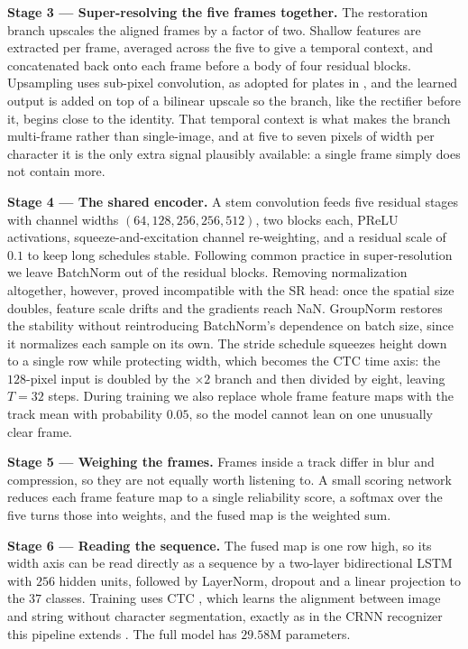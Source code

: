 \documentclass[runningheads]{llncs}
\begin{document}
\textbf{Stage 3 --- Super-resolving the five frames together.} The restoration branch upscales the aligned frames by a factor of two. Shallow features are extracted per frame, averaged across the five to give a temporal context, and concatenated back onto each frame before a body of four residual blocks. Upsampling uses sub-pixel convolution, as adopted for plates in \cite{nascimento2023attention}, and the learned output is added on top of a bilinear upscale so the branch, like the rectifier before it, begins close to the identity. That temporal context is what makes the branch multi-frame rather than single-image, and at five to seven pixels of width per character it is the only extra signal plausibly available: a single frame simply does not contain more.

\textbf{Stage 4 --- The shared encoder.} A stem convolution feeds five residual stages with channel widths $(64, 128, 256, 256, 512)$, two blocks each, PReLU activations, squeeze-and-excitation channel re-weighting, and a residual scale of $0.1$ to keep long schedules stable. Following common practice in super-resolution we leave BatchNorm out of the residual blocks. Removing normalization altogether, however, proved incompatible with the SR head: once the spatial size doubles, feature scale drifts and the gradients reach NaN. GroupNorm \cite{wu2018groupnorm} restores the stability without reintroducing BatchNorm's dependence on batch size, since it normalizes each sample on its own. The stride schedule squeezes height down to a single row while protecting width, which becomes the CTC time axis: the $128$-pixel input is doubled by the $\times 2$ branch and then divided by eight, leaving $T = 32$ steps. During training we also replace whole frame feature maps with the track mean with probability $0.05$, so the model cannot lean on one unusually clear frame.

\textbf{Stage 5 --- Weighing the frames.} Frames inside a track differ in blur and compression, so they are not equally worth listening to. A small scoring network reduces each frame feature map to a single reliability score, a softmax over the five turns those into weights, and the fused map is the weighted sum.

\textbf{Stage 6 --- Reading the sequence.} The fused map is one row high, so its width axis can be read directly as a sequence by a two-layer bidirectional LSTM with $256$ hidden units, followed by LayerNorm, dropout and a linear projection to the $37$ classes. Training uses CTC \cite{graves2006ctc}, which learns the alignment between image and string without character segmentation, exactly as in the CRNN recognizer this pipeline extends \cite{shi2017crnn}. The full model has $29.58$M parameters.
\end{document}
